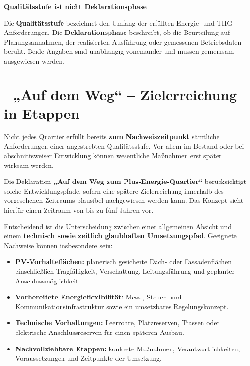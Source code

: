 \documentclass[
  ngerman,
  a4paper,
  DIV=11]{scrreprt}
\providecommand{\tightlist}{%
  \setlength{\itemsep}{0pt}\setlength{\parskip}{0pt}}
\begin{document}
\begin{tcolorbox}[enhanced jigsaw, arc=.35mm, bottomrule=.15mm, breakable, colback=white, colframe=quarto-callout-warning-color-frame, left=2mm, leftrule=.75mm, opacityback=0, rightrule=.15mm, toprule=.15mm]
\begin{minipage}[t]{5.5mm}
\textcolor{quarto-callout-warning-color}{\faExclamationTriangle}
\end{minipage}%
\begin{minipage}[t]{\textwidth - 5.5mm}

\vspace{-3mm}\textbf{Qualitätsstufe ist nicht Deklarationsphase}\vspace{3mm}

Die \textbf{Qualitätsstufe} bezeichnet den Umfang der erfüllten Energie-
und THG-Anforderungen. Die \textbf{Deklarationsphase} beschreibt, ob die
Beurteilung auf Planungsannahmen, der realisierten Ausführung oder
gemessenen Betriebsdaten beruht. Beide Angaben sind unabhängig
voneinander und müssen gemeinsam ausgewiesen werden.

\end{minipage}%
\end{tcolorbox}

\section{🧭 „Auf dem Weg`` -- Zielerreichung in
Etappen}\label{auf-dem-weg-zielerreichung-in-etappen}

Nicht jedes Quartier erfüllt bereits \textbf{zum Nachweiszeitpunkt}
sämtliche Anforderungen einer angestrebten Qualitätsstufe. Vor allem im
Bestand oder bei abschnittsweiser Entwicklung können wesentliche
Maßnahmen erst später wirksam werden.

Die Deklaration \textbf{„Auf dem Weg zum Plus-Energie-Quartier``}
berücksichtigt solche Entwicklungspfade, sofern eine spätere
Zielerreichung innerhalb des vorgesehenen Zeitraums plausibel
nachgewiesen werden kann. Das Konzept sieht hierfür einen Zeitraum von
bis zu fünf Jahren vor.

Entscheidend ist die Unterscheidung zwischen einer allgemeinen Absicht
und einem \textbf{technisch sowie zeitlich glaubhaften Umsetzungspfad}.
Geeignete Nachweise können insbesondere sein:

\begin{itemize}
\tightlist
\item
  \textbf{PV-Vorhalteflächen:} planerisch gesicherte Dach- oder
  Fassadenflächen einschließlich Tragfähigkeit, Verschattung,
  Leitungsführung und geplanter Anschlussmöglichkeit.
\item
  \textbf{Vorbereitete Energieflexibilität:} Mess-, Steuer- und
  Kommunikationsinfrastruktur sowie ein umsetzbares Regelungskonzept.
\item
  \textbf{Technische Vorhaltungen:} Leerrohre, Platzreserven, Trassen
  oder elektrische Anschlussreserven für einen späteren Ausbau.
\item
  \textbf{Nachvollziehbare Etappen:} konkrete Maßnahmen,
  Verantwortlichkeiten, Voraussetzungen und Zeitpunkte der Umsetzung.
\end{itemize}
\end{document}

